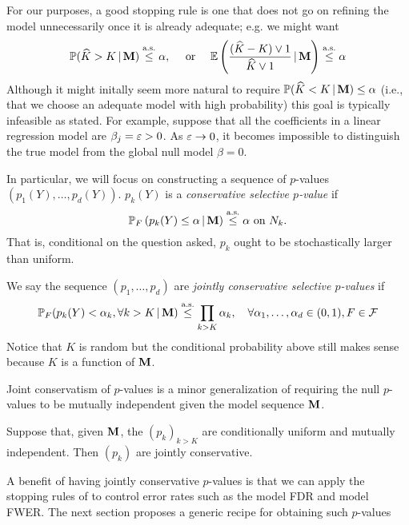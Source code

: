 \documentclass{article}
\begin{document}
For our purposes, a good stopping rule is one that does not go on refining the model unnecessarily once it is already adequate; e.g. we might want
\begin{equation}
  \mathbb{P}(\widehat{K} > K \,|\, \mathbf{M}) \overset{\textrm{a.s.}}{\leq} \alpha, \quad \text{ or } \quad \mathbb{E}\left(\frac{(\widehat{K} - K)\vee 1}{\widehat{K} \vee 1} \,|\, \mathbf{M} \right) \overset{\textrm{a.s.}}{\leq} \alpha
\end{equation}
Although it might initally seem more natural to require $\mathbb{P}(\widehat{K} < K \,|\, \mathbf{M}) \leq \alpha$ (i.e., that we choose an adequate model with high probability) this goal is typically infeasible as stated. For example, suppose that all the coefficients in a linear regression model are $\beta_j=\varepsilon>0$. As $\varepsilon\rightarrow 0$, it becomes impossible to distinguish the true model from the global null model $\beta=0$.

In particular, we will focus on constructing a sequence of $p$-values $(p_1(Y),\ldots,p_d(Y))$. $p_k(Y)$ is a {\em conservative selective $p$-value} if
\begin{equation}
  \mathbb{P}_F\left(p_k(Y) \leq \alpha \,|\, \mathbf{M}\right) \overset{\textrm{a.s.}}{\leq} \alpha \text{ on } N_k.
\end{equation}
That is, conditional on the question asked, $p_k$ ought to be stochastically larger than uniform.

We say the sequence $(p_1,\ldots,p_d)$ are {\em jointly conservative selective $p$-values} if
\begin{equation}
  \mathbb{P}_F(p_k(Y) < \alpha_k, \forall k>K \,|\, \mathbf{M}) \overset{\textrm{a.s.}}{\leq} \prod_{k>K} \alpha_k, \quad \forall \alpha_1,\ldots, \alpha_d\in (0,1), F\in \mathcal{F}
\end{equation}
Notice that $K$ is random but the conditional probability above still makes sense because $K$ is a function of $\mathbf{M}$.

Joint conservatism of $p$-values is a minor generalization of requiring the null $p$-values to be mutually independent given the model sequence $\mathbf{M}$.

\begin{proposition}
  Suppose that, given $\mathbf{M}$, the $(p_k)_{k>K}$ are conditionally uniform and mutually independent. Then $(p_k)$ are jointly conservative.
\end{proposition}

A  benefit of having jointly conservative $p$-values is that we can apply the stopping rules of \citet{gsell2013sequential} to control error rates such as the model FDR and model FWER. The next section proposes a generic recipe for obtaining such $p$-values
\end{document}
